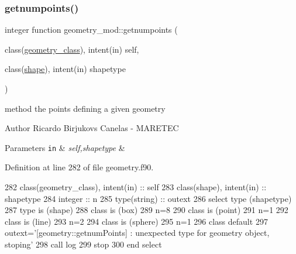 \subsubsection{\texorpdfstring{getnumpoints()}{getnumpoints()}}
{\footnotesize\ttfamily integer function geometry\+\_\+mod\+::getnumpoints (\begin{DoxyParamCaption}\item[{class(\mbox{\hyperlink{structgeometry__mod_1_1geometry__class}{geometry\+\_\+class}}), intent(in)}]{self,  }\item[{class(\mbox{\hyperlink{structgeometry__mod_1_1shape}{shape}}), intent(in)}]{shapetype }\end{DoxyParamCaption})\hspace{0.3cm}{\ttfamily [private]}}



method the points defining a given geometry 

\begin{DoxyAuthor}{Author}
Ricardo Birjukovs Canelas -\/ M\+A\+R\+E\+T\+EC 
\end{DoxyAuthor}

\begin{DoxyParams}[1]{Parameters}
\mbox{\tt in}  & {\em self,shapetype} & \\
\hline
\end{DoxyParams}


Definition at line 282 of file geometry.\+f90.


\begin{DoxyCode}
282     \textcolor{keywordtype}{class}(geometry\_class), \textcolor{keywordtype}{intent(in)} :: self
283     \textcolor{keywordtype}{class}(shape), \textcolor{keywordtype}{intent(in)} :: shapetype
284     \textcolor{keywordtype}{integer} :: n
285     \textcolor{keywordtype}{type}(string) :: outext
286     \textcolor{keywordflow}{select type} (shapetype)
287 \textcolor{keywordflow}{    type is} (shape)
288 \textcolor{keywordflow}{    class is} (box)
289         n=8
290 \textcolor{keywordflow}{    class is} (point)
291         n=1
292 \textcolor{keywordflow}{    class is} (line)
293         n=2
294 \textcolor{keywordflow}{    class is} (sphere)
295         n=1
296 \textcolor{keywordflow}{        class default}
297         outext=\textcolor{stringliteral}{'[geometry::getnumPoints] : unexpected type for geometry object, stoping'}
298         \textcolor{keyword}{call }log%
299         stop
300 \textcolor{keywordflow}{    end select}
\end{DoxyCode}
\mbox{\label{namespacegeometry__mod_a0b1a3c5aa414292ace34d59487082e3a}} 
